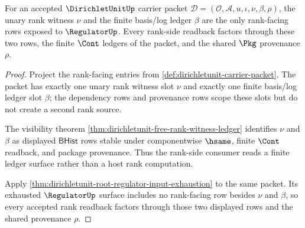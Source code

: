 \begin{theorem}
\label{thm:dirichletunit-visible-rank-ledger-projection}
For an accepted $\DirichletUnitUp$ carrier packet
$\mathcal{D}=(\mathcal{O},\mathcal{A},u,\iota,\nu,\beta,\rho)$, the unary rank
witness $\nu$ and the finite basis/log ledger $\beta$ are the only
rank-facing rows exposed to $\RegulatorUp$. Every rank-side readback factors
through these two rows, the finite $\Cont$ ledgers of the packet, and the
shared $\Pkg$ provenance $\rho$.
\end{theorem}
\begin{proof}
Project the rank-facing entries from
\autoref{def:dirichletunit-carrier-packet}. The packet has exactly one unary
rank witness slot $\nu$ and exactly one finite basis/log ledger slot $\beta$;
the dependency rows and provenance rows scope these slots but do not create a
second rank source.

The visibility theorem
\autoref{thm:dirichletunit-free-rank-witness-ledger} identifies $\nu$ and
$\beta$ as displayed $\mathsf{BHist}$ rows stable under componentwise
$\hsame$, finite $\Cont$ readback, and package provenance. Thus the rank-side
consumer reads a finite ledger surface rather than a host rank computation.

Apply \autoref{thm:dirichletunit-root-regulator-input-exhaustion} to the same
packet. Its exhausted $\RegulatorUp$ surface includes no rank-facing row
besides $\nu$ and $\beta$, so every accepted rank readback factors through
those two displayed rows and the shared provenance $\rho$.
\end{proof}

